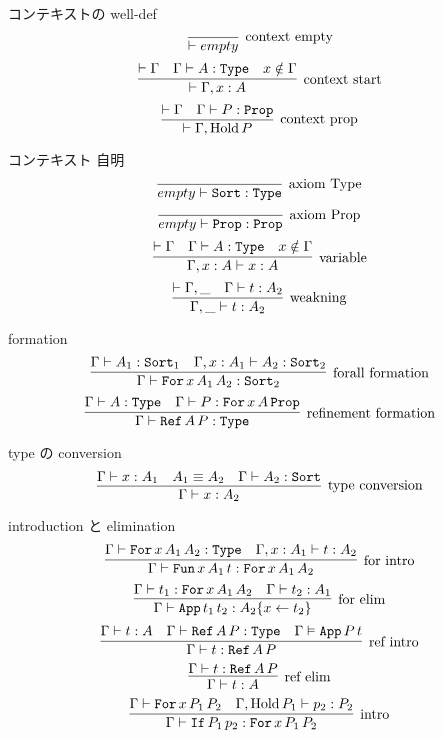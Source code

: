 \begin{itembox}[l]{コンテキストの well-def}
  \[\infer[\text{context empty}]{\vdash empty}{}\]
  \[\infer[\text{context start}]{\vdash \Gamma , x : A}{\vdash \Gamma & \Gamma \vdash A : \texttt{Type} & x \notin \Gamma}\]
  \[\infer[\text{context prop}]{\vdash \Gamma , \text{Hold} \, P}{\vdash \Gamma & \Gamma \vdash P : \texttt{Prop}}\]
\end{itembox}

\begin{itembox}[l]{コンテキスト 自明}
  \[\infer[\text{axiom Type}]{empty \vdash \texttt{Sort} : \texttt{Type}}{}\]
  \[\infer[\text{axiom Prop}]{empty \vdash \texttt{Prop} : \texttt{Prop}}{}\]
  \[\infer[\text{variable}]{\Gamma , x : A \vdash x : A}{\vdash \Gamma & \Gamma \vdash A : \texttt{Type} & x \notin \Gamma}\]
  \[\infer[\text{weakning}]{\Gamma , \_ \vdash t : A_2}{\vdash \Gamma , \_ & \Gamma \vdash t : A_2} \]
\end{itembox}

\begin{itembox}[l]{formation}
  \[\infer[\text{forall formation}]{\Gamma \vdash \texttt{For} \, x \, A_1 \, A_2 : \texttt{Sort}_2}{\Gamma \vdash A_1 : \texttt{Sort}_1 & \Gamma , x : A_1 \vdash A_2 : \texttt{Sort}_2 }\]
  \[\infer[\text{refinement formation}]{\Gamma \vdash \texttt{Ref} \, A \, P : \texttt{Type}}{\Gamma \vdash A : \texttt{Type} & \Gamma \vdash P : \texttt{For} \, x \, A \, \texttt{Prop}}\]
\end{itembox}

\begin{itembox}[l]{type の conversion}
  \[\infer[\text{type conversion}]{\Gamma \vdash x : A_2}{\Gamma \vdash x : A_1 & A_1 \equiv A_2 & \Gamma \vdash A_2 : \texttt{Sort}} \]
\end{itembox}

\begin{itembox}[l]{introduction と elimination}
  \[\infer[\text{for intro}]{\Gamma \vdash \texttt{Fun} \, x \, A_1 \, t : \texttt{For} \, x \, A_1 \, A_2}{\Gamma \vdash \texttt{For} \, x \, A_1 \, A_2 : \texttt{Type} & \Gamma , x : A_1 \vdash t : A_2}\]
  \[\infer[\text{for elim}]{\Gamma \vdash \texttt{App} \, t_1 \, t_2 : A_2\{x \leftarrow t_2\}}{\Gamma \vdash t_1 : \texttt{For} \, x \, A_1 \, A_2 & \Gamma \vdash t_2 : A_1}\]
  \[\infer[\text{ref intro}]{\Gamma \vdash t : \texttt{Ref} \, A \, P}{\Gamma \vdash t : A & \Gamma \vdash \texttt{Ref} \, A \, P : \texttt{Type} & \Gamma \vDash \texttt{App} \, P \, t} \]
  \[\infer[\text{ref elim}]{\Gamma \vdash t : A}{\Gamma \vdash t : \texttt{Ref} \, A \, P} \]
  \[\infer[\text{intro}]{\Gamma \vdash \texttt{If} \, P_1 \, p_2 : \texttt{For} \, x \, P_1 \, P_2}{\Gamma \vdash \texttt{For} \, x \, P_1 \, P_2 & \Gamma , \text{Hold} \, P_1 \vdash p_2 : P_2}\]
\end{itembox}

